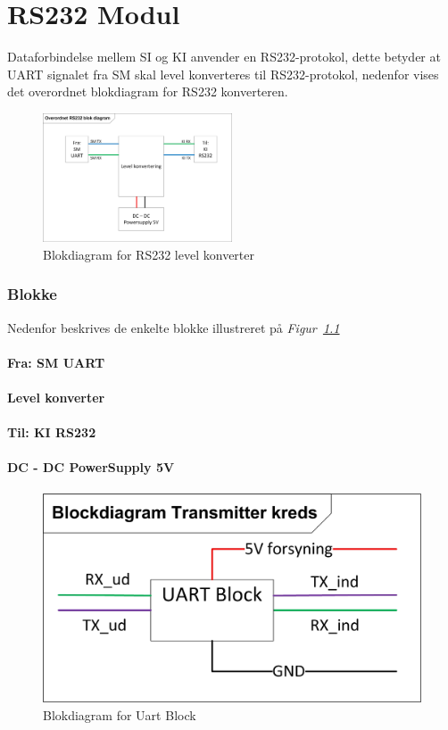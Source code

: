 \chapter{RS232 Modul}
\label{ch:rs232}
Dataforbindelse mellem SI og KI anvender en RS232-protokol, dette betyder at UART signalet fra SM skal level konverteres til RS232-protokol, nedenfor vises det overordnet blokdiagram for RS232 konverteren.
\begin{figure}[H]
\centering
\includegraphics[width=0.5\textwidth]{billeder/RS232ModulBlok}
\caption{Blokdiagram for RS232 level konverter}
\label{fig:RS232ModulBlok}
\end{figure}
\subsection{Blokke}
Nedenfor beskrives de enkelte blokke illustreret på \textit{Figur~\ref{fig:RS232ModulBlok}}
\subsubsection{Fra: SM UART}
\subsubsection{Level konverter}
\subsubsection{Til: KI RS232}
\subsubsection{DC - DC PowerSupply 5V}
\begin{figure}[H]
\centering
\includegraphics[scale=1.1]{billeder/uartblock}
\caption{Blokdiagram for Uart Block}
\label{fig:SMUART}
\end{figure}
